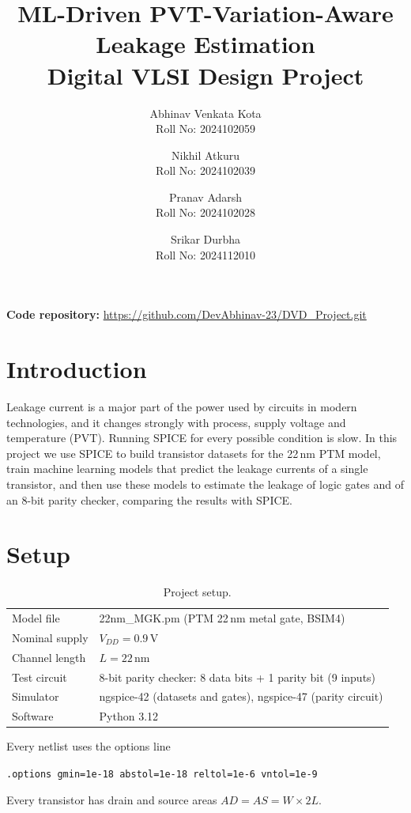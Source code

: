 \documentclass[11pt]{article}
\title{\textbf{ML-Driven PVT-Variation-Aware Leakage Estimation}\\[4pt]
       \large Digital VLSI Design Project}
\author
{
    Abhinav Venkata Kota \\ Roll No: 2024102059
    \and
    Nikhil Atkuru \\ Roll No: 2024102039
    \and
    Pranav Adarsh \\ Roll No: 2024102028
    \and
    Srikar Durbha \\ Roll No: 2024112010
}
\date{}
\begin{document}
\maketitle
\tableofcontents

\vspace{1em}
\noindent\textbf{Code repository:} \url{https://github.com/DevAbhinav-23/DVD_Project.git}
\newpage

\section{Introduction}

Leakage current is a major part of the power used by circuits in modern
technologies, and it changes strongly with process, supply voltage and
temperature (PVT). Running SPICE for every possible condition is slow. In
this project we use SPICE to build transistor datasets for the 22\,nm PTM
model, train machine learning models that predict the leakage currents of a
single transistor, and then use these models to estimate the leakage of
logic gates and of an 8-bit parity checker, comparing the results with SPICE.

\section{Setup}

\begin{table}[H]
\centering
\begin{tabular}{ll}
\toprule
Model file & 22nm\_MGK.pm (PTM 22\,nm metal gate, BSIM4) \\
Nominal supply & $V_{DD} = 0.9$\,V \\
Channel length & $L = 22$\,nm \\
Test circuit & 8-bit parity checker: 8 data bits + 1 parity bit (9 inputs) \\
Simulator & ngspice-42 (datasets and gates), ngspice-47 (parity circuit) \\
Software & Python 3.12 \\
\bottomrule
\end{tabular}
\caption{Project setup.}
\label{tab:setup}
\end{table}

Every netlist uses the options line
\begin{center}
\texttt{.options gmin=1e-18 abstol=1e-18 reltol=1e-6 vntol=1e-9}
\end{center}
Every transistor has drain and source areas $AD = AS = W \times 2L$.
\end{document}
